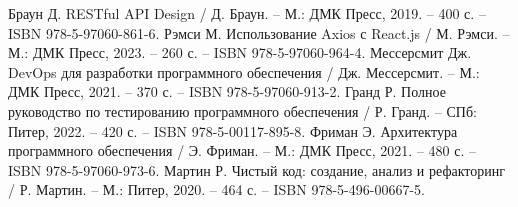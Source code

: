 \begin{thebibliography}{9}
	 Браун Д. RESTful API Design / Д. Браун. – М.: ДМК Пресс, 2019. – 400 с. – ISBN 978-5-97060-861-6.
	 Рэмси М. Использование Axios с React.js / М. Рэмси. – М.: ДМК Пресс, 2023. – 260 с. – ISBN 978-5-97060-964-4.
	 Мессерсмит Дж. DevOps для разработки программного обеспечения / Дж. Мессерсмит. – М.: ДМК Пресс, 2021. – 370 с. – ISBN 978-5-97060-913-2.
	 Гранд Р. Полное руководство по тестированию программного обеспечения / Р. Гранд. – СПб: Питер, 2022. – 420 с. – ISBN 978-5-00117-895-8.
	 Фриман Э. Архитектура программного обеспечения / Э. Фриман. – М.: ДМК Пресс, 2021. – 480 с. – ISBN 978-5-97060-973-6.
	 Мартин Р. Чистый код: создание, анализ и рефакторинг / Р. Мартин. – М.: Питер, 2020. – 464 с. – ISBN 978-5-496-00667-5.
\end{thebibliography}
